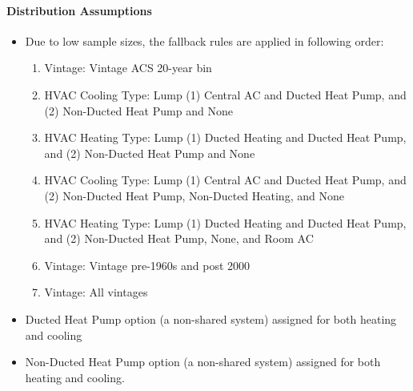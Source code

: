 \paragraph{Distribution Assumptions}
% 
\begin{itemize}
    \item Due to low sample sizes, the fallback rules are applied in following order:
    \begin{enumerate}
        \item Vintage: Vintage ACS 20-year bin
        \item HVAC Cooling Type: Lump (1) Central AC and Ducted Heat Pump, and (2) Non-Ducted Heat Pump and None
        \item HVAC Heating Type: Lump (1) Ducted Heating and Ducted Heat Pump, and (2) Non-Ducted Heat Pump and None
        \item HVAC Cooling Type: Lump (1) Central AC and Ducted Heat Pump, and (2) Non-Ducted Heat Pump, Non-Ducted Heating, and None
        \item HVAC Heating Type: Lump (1) Ducted Heating and Ducted Heat Pump, and (2) Non-Ducted Heat Pump, None, and Room AC
        \item Vintage: Vintage pre-1960s and post 2000
        \item Vintage: All vintages
    \end{enumerate}

    \item Ducted Heat Pump option (a non-shared system) assigned for both heating and cooling
    \item Non-Ducted Heat Pump option (a non-shared system) assigned for both heating and cooling.
\end{itemize}
